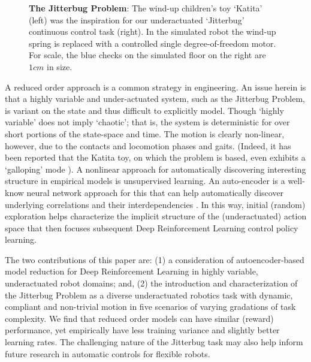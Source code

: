 \documentclass[letterpaper, 10 pt, conference]{ieeeconf}
\begin{document}
\begin{figure}[ht]
    \caption{
        \textbf{The Jitterbug Problem}: The wind-up children's toy `Katita' (left) was the inspiration for our underactuated `Jitterbug' continuous control task (right).
        In the simulated robot the wind-up spring is replaced with a controlled single degree-of-freedom motor.
        For scale, the blue checks on the simulated floor on the right are $1cm$ in size.
    }
    \label{fig:leader}
    
\end{figure}

A reduced order approach is a common strategy in engineering.   An issue herein is that a highly variable and under-actuated system, such as the Jitterbug Problem, is variant on the state and thus difficult to explicitly model. 
Though `highly variable' does not imply `chaotic'; that is, the system is deterministic for over short portions of the state-space and time.  The motion is clearly non-linear, however, due to the contacts and locomotion phases and gaits.  (Indeed, it has been reported that the Katita toy, on which the problem is based, even exhibits a `galloping' mode \cite{jgn.thesis}).  A nonlinear approach for automatically discovering interesting structure in empirical models is unsupervised learning.  An auto-encoder is a well-know neural network approach for this that can help automatically discover underlying correlations and their interdependencies \cite{AE_hinton2006reducing}.   %
In this way, initial (random) exploration helps characterize the implicit structure of the (underactuated) action space that then focuses subsequent Deep Reinforcement Learning control policy learning.

The two contributions of this paper are: (1) a consideration of autoencoder-based model reduction for Deep Reinforcement Learning in highly variable, underactuated robot domains; and, (2) the introduction and characterization of the Jitterbug Problem as a diverse underactuated robotics task with dynamic, compliant and non-trivial motion in five scenarios of varying gradations of task complexity.  We find that reduced order models can have similar (reward) performance, yet empirically have less training variance and slightly better learning rates.  The challenging nature of the Jitterbug task may also help inform future research in automatic controls for flexible robots. %
\end{document}
